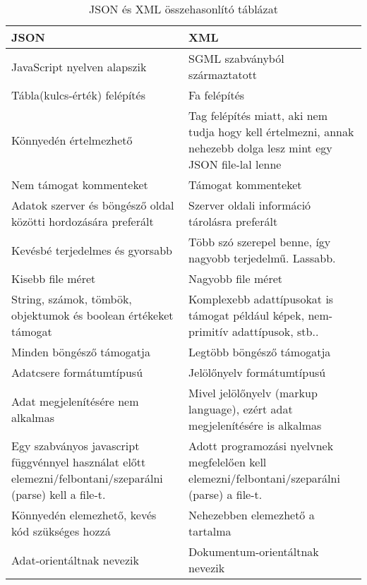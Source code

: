 \begin{table}[H]
	\centering
	\caption{JSON és XML összehasonlító táblázat}
	\label{tab:jsonandxml}
	\medskip
	\begin{tabular}{|p{7.2cm}|p{7.2cm}|}
		\hline
		\textbf{JSON} & \textbf{XML} \\
		\hline
		JavaScript nyelven alapszik & SGML szabványból származtatott \\
		\hline
		Tábla(kulcs-érték) felépítés & Fa felépítés \\
		\hline
		Könnyedén értelmezhető & Tag felépítés miatt, aki nem tudja hogy kell értelmezni, annak nehezebb dolga lesz mint egy JSON file-lal lenne\\
		\hline
		Nem támogat kommenteket & Támogat kommenteket \\
		\hline
		Adatok szerver és böngésző oldal közötti hordozására preferált & Szerver oldali információ tárolásra preferált\\
		\hline
		Kevésbé terjedelmes és gyorsabb & Több szó szerepel benne, így nagyobb terjedelmű. Lassabb.\\
		\hline
		Kisebb file méret & Nagyobb file méret\\
		\hline
		String, számok, tömbök, objektumok és boolean értékeket támogat & Komplexebb adattípusokat is támogat például képek, nem-primitív adattípusok, stb..\\
		\hline
		Minden böngésző támogatja & Legtöbb böngésző támogatja\\
		\hline
		Adatcsere formátumtípusú & Jelölőnyelv formátumtípusú\\
		\hline
		Adat megjelenítésére nem alkalmas & Mivel jelölőnyelv (markup language), ezért adat megjelenítésére is alkalmas\\
		\hline
		Egy szabványos javascript függvénnyel használat előtt elemezni/felbontani/szeparálni (parse) kell a file-t. & Adott programozási nyelvnek megfelelően kell elemezni/felbontani/szeparálni (parse) a file-t.\\
		\hline
		Könnyedén elemezhető, kevés kód szükséges hozzá & Nehezebben elemezhető a tartalma\\
		\hline
		Adat-orientáltnak nevezik & Dokumentum-orientáltnak nevezik\\
		\hline
	\end{tabular}
\end{table}

